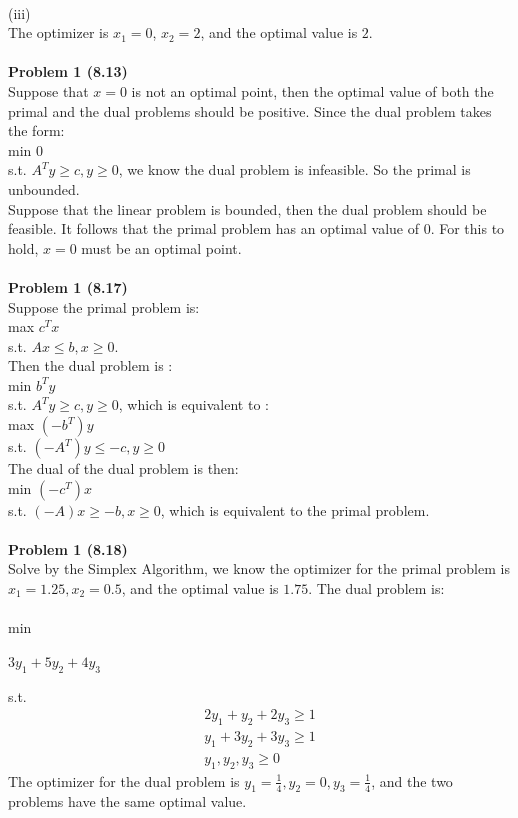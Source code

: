 \documentclass[letterpaper,12pt]{article}
\theoremstyle{definition}
\begin{document}
\\
(iii)\\
The optimizer is $x_1 = 0$, $x_2=2$, and the optimal value is $2$. \\
\\
\noindent\textbf{Problem 1 (8.13)} \\
Suppose that $x=0$ is not an optimal point, then the optimal value of both the primal and the dual problems should be positive. Since the dual problem takes the form:\\
min $0$\\
s.t. $A^Ty \geq c, y\geq0$, we know the dual problem is infeasible. So the primal is unbounded.\\
Suppose that the linear problem is bounded, then the dual problem should be feasible. It follows that the primal problem has an optimal value of 0. For this to hold, $x=0$ must be an optimal point.\\
\\
\noindent\textbf{Problem 1 (8.17)} \\
Suppose the primal problem is:\\
max $c^Tx$\\
s.t. $Ax\leq b, x\geq 0$.\\
Then the dual problem is :\\
min $b^Ty$\\
s.t. $A^Ty\geq c, y\geq 0$, which is equivalent to :\\
max $(-b^T)y$\\
s.t. $(-A^T)y\leq -c, y\geq 0$\\
The dual of the dual problem is then:\\
min $(-c^T)x$\\
s.t. $(-A)x\geq -b, x\geq 0$, which is equivalent to the primal problem.\\
\\
\noindent\textbf{Problem 1 (8.18)} \\
Solve by the Simplex Algorithm, we know the optimizer for the primal problem is $x_1 = 1.25, x_2 = 0.5$, and the optimal value is $1.75$. The dual problem is: \\
\\
min\begin{center}
$3y_1+5y_2+4y_3$
\end{center}
s.t.
\begin{align*}
2y_1+y_2+2y_3\geq 1\\
y_1+3y_2+3y_3\geq 1\\
y_1, y_2, y_3 \geq 0
\end{align*}
The optimizer for the dual problem is $y_1=\frac{1}{4}, y_2=0, y_3 = \frac{1}{4}$, and the two problems have the same optimal value.
\end{document}
